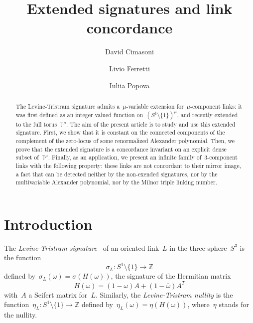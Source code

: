\documentclass{amsart}
\title{Extended signatures and link concordance}
\author{David Cimasoni}
\author{Livio Ferretti}
\author{Iuliia Popova}
\newcommand{\Z}{\mathbb{Z}}
\newcommand{\T}{\mathbb{T}}
\theoremstyle{definition}
\theoremstyle{remark}
\begin{document}
\makeatletter
   \providecommand\@dotsep{5}
 \makeatother

\begin{abstract}
The Levine-Tristram signature admits a~$\mu$-variable extension for~$\mu$-component links: it was first defined as an integer valued function on~$(S^1\setminus\{1\})^\mu$, and recently extended to
the full torus~$\T^\mu$. The aim of the present article is to study and use this extended signature.
First, we show that it is constant on the connected components of the complement of the zero-locus of some renormalized Alexander polynomial. Then, we prove that the extended signature is a concordance invariant on an explicit dense subset
of~$\T^\mu$. Finally, as an application, we present an infinite family of~3-component links with the following property:
these links are not concordant to their mirror image, a fact that can be detected neither by the non-exended signatures, nor by the multivariable Alexander polynomial, nor by the Milnor triple linking number.
\end{abstract}




\maketitle

	

	\section{Introduction}
	\label{sec:intro}
	
The {\em Levine-Tristram signature\/}~\cite{Tro,Mur,Tri,Lev} of an oriented link~$L$ in the three-sphere~$S^3$ is the function
\[
\sigma_L\colon S^1\setminus\{1\}\longrightarrow \Z
\]
defined by~$\sigma_L(\omega)=\sigma(H(\omega))$,
the signature of the Hermitian matrix
\begin{equation}
\label{eq:H}
H(\omega)=(1-\omega)A+(1-\overline{\omega})A^T
\end{equation}
with~$A$ a Seifert matrix for~$L$. Similarly, the {\em Levine-Tristram nullity\/}
is the function~$\eta_L\colon S^1\setminus\{1\}\to \Z$ defined by~$\eta_L(\omega)=\eta(H(\omega))$, where~$\eta$ stands for the nullity.
\end{document}
